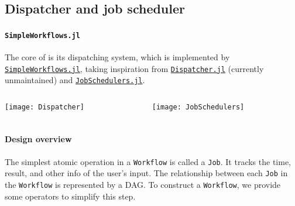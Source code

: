 \subsection{Dispatcher and job scheduler}

\begin{frame}
    \frametitle{\subsecname}
    \framesubtitle{\texttt{SimpleWorkflows.jl}}

    The core of \express{} is its dispatching system,
    which is implemented by
    \href{https://github.com/MineralsCloud/SimpleWorkflows.jl}{\texttt{SimpleWorkflows.jl}},
    taking inspiration from
    \href{https://github.com/invenia/Dispatcher.jl}{\texttt{Dispatcher.jl}}
    (currently unmaintained) and
    \href{https://github.com/cihga39871/JobSchedulers.jl}{\texttt{JobSchedulers.jl}}.

    \begin{columns}[t]
        \begin{column}{0.4\textwidth}
            \begin{center}
                \texttt{[image: Dispatcher]}
            \end{center}
        \end{column}
        \hfill
        \begin{column}{0.4\textwidth}
            \begin{center}
                \texttt{[image: JobSchedulers]}
            \end{center}
        \end{column}
    \end{columns}
\end{frame}

\begin{frame}
    \frametitle{\subsecname}
    \framesubtitle{Design overview}

    The simplest atomic operation in a \texttt{Workflow} is called a \texttt{Job}.
    It tracks the time, result, and other info of the user's input.
    The relationship between each \texttt{Job} in the \texttt{Workflow} is represented by a
    DAG.
    To construct a \texttt{Workflow}, we provide some operators to simplify this step.
\end{frame}

